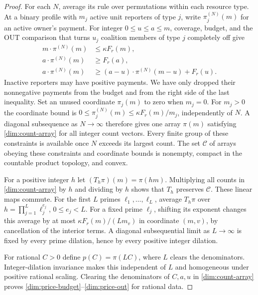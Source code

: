 \documentclass[11pt]{article}
\theoremstyle{definition}\newtheorem{definition}[theorem]{Definition}
\theoremstyle{remark}\newtheorem{remark}[theorem]{Remark}
\begin{document}
\begin{proof}
For each $N$, average its rule over permutations within each resource
type. At a binary profile with $m_j$ active unit reporters of type $j$,
write $\pi_j^{(N)}(m)$ for an active owner's payment. For integer
$0\le u\le a\le m$, coverage, budget, and the OUT comparison that
turns $u_j$ coalition members of type $j$ completely off give
\begin{align}
 m\cdot\pi^{(N)}(m)&\le\kappa F_r(m),\nonumber\\
 a\cdot\pi^{(N)}(m)&\ge F_r(a),\label{dim:count-array}\\
 a\cdot\pi^{(N)}(m)&\ge
 (a-u)\cdot\pi^{(N)}(m-u)+F_r(u).\nonumber
\end{align}
Inactive reporters may have positive payments. We have only dropped their
nonnegative payments from the budget and from the right side of the last
inequality. Set an unused coordinate $\pi_j(m)$ to zero when $m_j=0$.
For $m_j>0$ the coordinate bound is
$0\le\pi_j^{(N)}(m)\le\kappa F_r(m)/m_j$, independently of $N$.
A diagonal subsequence as $N\to\infty$ therefore gives one array
$\pi(m)$ satisfying \eqref{dim:count-array} for all integer count vectors.
Every finite group of these constraints is available once $N$ exceeds
its largest count. The set $\mathcal C$ of arrays obeying these constraints
and coordinate bounds is nonempty, compact in the countable product
topology, and convex.

For a positive integer $h$ let $(T_h\pi)(m)=\pi(hm)$.
Multiplying all counts in \eqref{dim:count-array} by $h$ and dividing by
$h$ shows that $T_h$ preserves $\mathcal C$. These linear maps commute.
For the first $L$ primes $\ell_1,\ldots,\ell_L$, average $T_h\pi$ over
$h=\prod_{j=1}^L\ell_j^{e_j}$, $0\le e_j<L$.
For a fixed prime $\ell_j$, shifting its exponent changes this average
by at most $\kappa F_r(m)/(Lm_v)$ in coordinate $(m,v)$, by cancellation
of the interior terms. A diagonal subsequential limit as $L\to\infty$
is fixed by every prime dilation, hence by every positive integer dilation.

For rational $C>0$ define $p(C)=\pi(LC)$, where $L$ clears the
denominators. Integer-dilation invariance makes this independent of $L$
and homogeneous under positive rational scaling. Clearing the
denominators of $C,a,u$ in \eqref{dim:count-array} proves
\eqref{dim:price-budget}--\eqref{dim:price-out} for rational data.


\end{proof}
\end{document}
